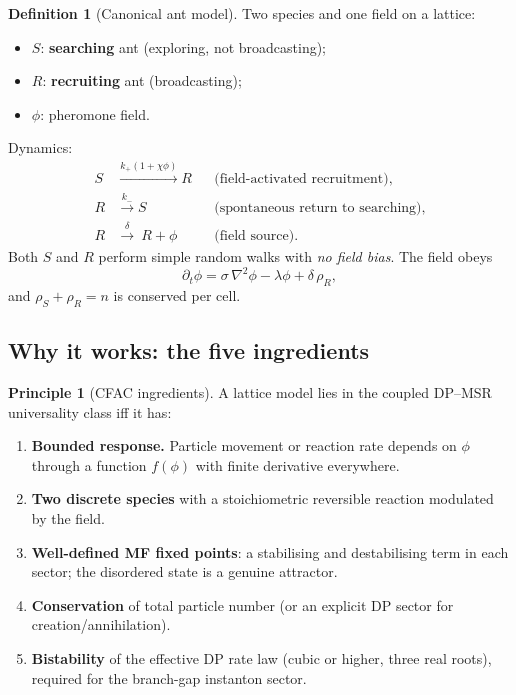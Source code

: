 \documentclass[10pt,a4paper,twocolumn]{article}
\theoremstyle{definition}
\newtheorem{definition}[theorem]{Definition}
\newtheorem*{principle}{Principle}
\begin{document}
\begin{definition}[Canonical ant model]\label{def:canonical}
Two species and one field on a lattice:
\begin{itemize}
  \item $S$: \textbf{searching} ant (exploring, not broadcasting);
  \item $R$: \textbf{recruiting} ant (broadcasting);
  \item $\phi$: pheromone field.
\end{itemize}
Dynamics:
\begin{align}
  S &\xrightarrow{k_+(1+\chi\phi)} R
  &&\text{(field-activated recruitment)}, \\
  R &\xrightarrow{k_-} S
  &&\text{(spontaneous return to searching)}, \\
  R &\xrightarrow{\delta}\ R+\phi
  &&\text{(field source)}.
\end{align}
Both $S$ and $R$ perform simple random walks with \emph{no field
bias}.  The field obeys
\begin{equation}\label{eq:phi-dyn}
  \partial_t\phi = \sigma\,\nabla^2\phi - \lambda\phi + \delta\,\rho_R,
\end{equation}
and $\rho_S+\rho_R = n$ is conserved per cell.
\end{definition}

\subsection{Why it works: the five ingredients}\label{sec:ingredients}

\begin{principle}[CFAC ingredients]\label{prin:ingredients}
A lattice model lies in the coupled DP--MSR universality class
iff it has:
\begin{enumerate}
  \item[(I1)] \textbf{Bounded response.}  Particle movement or
    reaction rate depends on $\phi$ through a function $f(\phi)$
    with finite derivative everywhere.
  \item[(I2)] \textbf{Two discrete species} with a stoichiometric
    reversible reaction modulated by the field.
  \item[(I3)] \textbf{Well-defined MF fixed points}: a stabilising
    and destabilising term in each sector; the disordered state is
    a genuine attractor.
  \item[(I4)] \textbf{Conservation} of total particle number (or
    an explicit DP sector for creation/annihilation).
  \item[(I5)] \textbf{Bistability} of the effective DP rate law
    (cubic or higher, three real roots), required for the
    branch-gap instanton sector.
\end{enumerate}
\end{principle}
\end{document}
